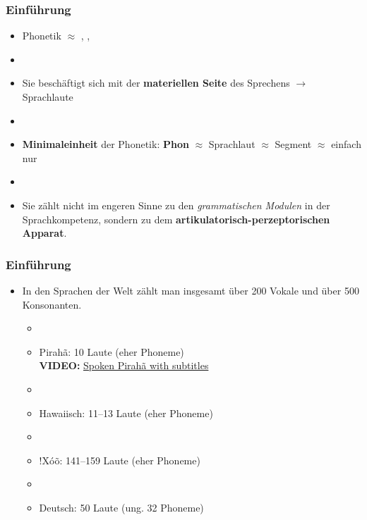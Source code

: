 \begin{frame}
\frametitle{Einführung}

	\begin{itemize}
		\item Phonetik $\approx$ , , 
		\item[]
		\item Sie beschäftigt sich mit der \textbf{materiellen Seite} des Sprechens $\rightarrow$ Sprachlaute 
		\item[]
		\item \textbf{Minimaleinheit} der Phonetik: \textbf{Phon} $\approx$ Sprachlaut $\approx$ Segment $\approx$ einfach nur 
		\item[]
		\item Sie zählt nicht im engeren Sinne zu den \textit{grammatischen Modulen} in der Sprachkompetenz, sondern zu dem \textbf{artikulatorisch-perzeptorischen Apparat}.
	\end{itemize}
	
\end{frame}




\begin{frame}
\frametitle{Einführung}

	\begin{itemize}
		\item In den Sprachen der Welt zählt man insgesamt über 200 Vokale und über 500 Konsonanten.
		
		\begin{itemize}
			\item[]
			\item Pirahã: 10 Laute (eher Phoneme)\\
			\textbf{VIDEO:} \href{run:material/04SpokenPiraha.mp4}{Spoken Pirahã with subtitles}
			\item[]
			\item Hawaiisch: 11--13 Laute (eher Phoneme)
			\item[]
			\item {!}Xóõ: 141--159 Laute (eher Phoneme)
			\item[]
			\item Deutsch: 50 Laute (ung. 32 Phoneme)
		\end{itemize}
		
	\end{itemize}
	
\end{frame}



